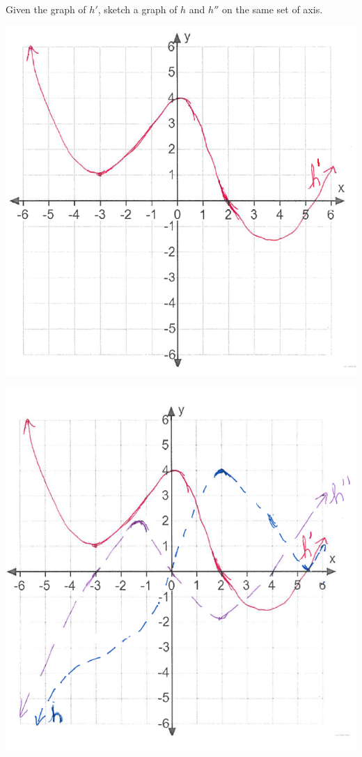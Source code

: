 \documentclass[nooutcomes]{ximera}
\begin{document}
\begin{problem}
Given the graph of $h'$, sketch a graph of $h$ and $h''$ on the same set of axis.
      \begin{image}
        \includegraphics[scale = 0.6]{figure1.png}
      \end{image}



\begin{freeResponse} \hfil


      \begin{image}
        \includegraphics[scale = 0.5]{figure7.png}
      \end{image}	
				

\end{freeResponse}
\end{problem}
\end{document}
